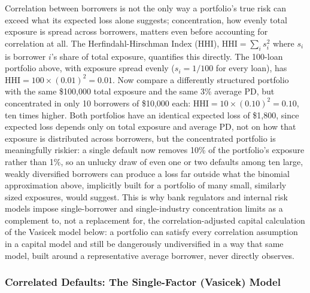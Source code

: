 \documentclass[../ai_in_finance]{subfiles}
\begin{document}
Correlation between borrowers is not the only way a portfolio's true risk can exceed what its expected loss alone suggests; concentration, how evenly total exposure is spread across borrowers, matters even before accounting for correlation at all. The Herfindahl-Hirschman Index (HHI), $\text{HHI} = \sum_i s_i^2$ where $s_i$ is borrower $i$'s share of total exposure, quantifies this directly. The 100-loan portfolio above, with exposure spread evenly ($s_i = 1/100$ for every loan), has $\text{HHI} = 100 \times (0.01)^2 = 0.01$. Now compare a differently structured portfolio with the same \$100,000 total exposure and the same 3\% average PD, but concentrated in only 10 borrowers of \$10,000 each: $\text{HHI} = 10 \times (0.10)^2 = 0.10$, ten times higher.
Both portfolios have an identical expected loss of \$1,800, since expected loss depends only on total exposure and average PD, not on how that exposure is distributed across borrowers, but the concentrated portfolio is meaningfully riskier: a single default now removes 10\% of the portfolio's exposure rather than 1\%, so an unlucky draw of even one or two defaults among ten large, weakly diversified borrowers can produce a loss far outside what the binomial approximation above, implicitly built for a portfolio of many small, similarly sized exposures, would suggest.
This is why bank regulators and internal risk models impose single-borrower and single-industry concentration limits as a complement to, not a replacement for, the correlation-adjusted capital calculation of the Vasicek model below: a portfolio can satisfy every correlation assumption in a capital model and still be dangerously undiversified in a way that same model, built around a representative average borrower, never directly observes.

\subsubsection*{Correlated Defaults: The Single-Factor (Vasicek) Model}
\label{sec:vasicek}
\end{document}

